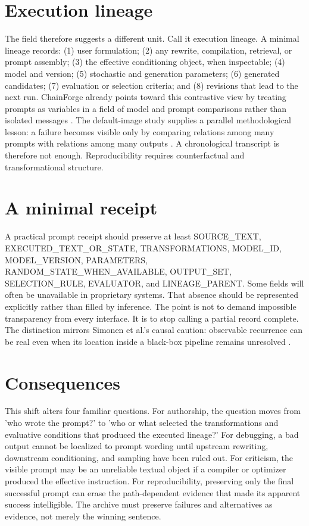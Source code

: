 \documentclass[11pt]{article}
\begin{document}
\section{Execution lineage}
The field therefore suggests a different unit. Call it execution lineage. A minimal lineage records: (1) user formulation; (2) any rewrite, compilation, retrieval, or prompt assembly; (3) the effective conditioning object, when inspectable; (4) model and version; (5) stochastic and generation parameters; (6) generated candidates; (7) evaluation or selection criteria; and (8) revisions that lead to the next run. ChainForge already points toward this contrastive view by treating prompts as variables in a field of model and prompt comparisons rather than isolated messages \citep{Arawjo2023ChainForge}. The default-image study supplies a parallel methodological lesson: a failure becomes visible only by comparing relations among many prompts with relations among many outputs \citep{Simonen2026DefaultImages}. A chronological transcript is therefore not enough. Reproducibility requires counterfactual and transformational structure.
\section{A minimal receipt}
A practical prompt receipt should preserve at least SOURCE\_TEXT, EXECUTED\_TEXT\_OR\_STATE, TRANSFORMATIONS, MODEL\_ID, MODEL\_VERSION, PARAMETERS, RANDOM\_STATE\_WHEN\_AVAILABLE, OUTPUT\_SET, SELECTION\_RULE, EVALUATOR, and LINEAGE\_PARENT. Some fields will often be unavailable in proprietary systems. That absence should be represented explicitly rather than filled by inference. The point is not to demand impossible transparency from every interface. It is to stop calling a partial record complete. The distinction mirrors Simonen et al.'s causal caution: observable recurrence can be real even when its location inside a black-box pipeline remains unresolved \citep{Simonen2026DefaultImages}.
\section{Consequences}
This shift alters four familiar questions. For authorship, the question moves from 'who wrote the prompt?' to 'who or what selected the transformations and evaluative conditions that produced the executed lineage?' For debugging, a bad output cannot be localized to prompt wording until upstream rewriting, downstream conditioning, and sampling have been ruled out. For criticism, the visible prompt may be an unreliable textual object if a compiler or optimizer produced the effective instruction. For reproducibility, preserving only the final successful prompt can erase the path-dependent evidence that made its apparent success intelligible. The archive must preserve failures and alternatives as evidence, not merely the winning sentence.
\end{document}
